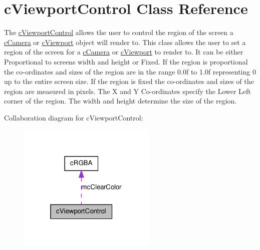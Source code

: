 \hypertarget{classc_viewport_control}{
\section{cViewportControl Class Reference}
\label{classc_viewport_control}
}


The \hyperlink{classc_viewport_control}{cViewportControl} allows the user to control the region of the screen a \hyperlink{classc_camera}{cCamera} or \hyperlink{classc_viewport}{cViewport} object will render to. This class allows the user to set a region of the screen for a \hyperlink{classc_camera}{cCamera} or \hyperlink{classc_viewport}{cViewport} to render to. It can be either Proportional to screens width and height or Fixed. If the region is proportional the co-\/ordinates and sizes of the region are in the range 0.0f to 1.0f representing 0 up to the entire screen size. If the region is fixed the co-\/ordinates and sizes of the region are measured in pixels. The X and Y Co-\/ordinates specify the Lower Left corner of the region. The width and height determine the size of the region.  




Collaboration diagram for cViewportControl:\nopagebreak
\begin{figure}[H]
\begin{center}
\leavevmode
\includegraphics[width=187pt]{classc_viewport_control__coll__graph}
\end{center}
\end{figure}
